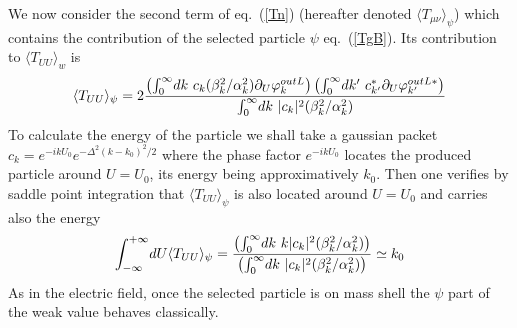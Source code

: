 \documentclass[12pt,oneside]{report}
\def\p {\prime}
\begin{document}
We now consider the second term of eq.~(\ref{Tn}) (hereafter denoted 
$\langle T_{\mu\nu}\rangle_{\psi}$)
which contains
the contribution of the selected particle $\psi$ eq.~(\ref{TgB}). 
Its contribution to $\langle T_{UU}\rangle_w$ is
\begin{equation}
\langle T_{UU}\rangle_{\psi} =2{
 \left(\int_0^\infty \! dk\ 
c_k (\beta_k^2 /\alpha_k^2) \partial_U \varphi^{out  L}_k\right)\left(
\int_0^\infty \! dk^\p\ 
c_{k^\p}^* 
\partial_U \varphi^{out L *}_{k^\p}\right)
\over 
\int_0^\infty \! dk\ 
\vert c_k \vert^2 ( \beta_k^2/ \alpha_k^2)
}
\label{To}
\end{equation}
To calculate the energy of the particle we shall take a
gaussian packet \break $c_k = e^{-ik U_0} e^{-\Delta^2
(k-k_0)^2/2}$ where the phase factor $e^{-ik U_0}$ locates the
produced particle around $U=U_0$, its energy being
approximatively $k_0$. Then one verifies by saddle point
integration that $\langle T_{UU}\rangle_{\psi}$ is also
located around $U=U_0$
and carries also the energy 
\begin{equation}
\int_{-\infty}^{+\infty}\!dU
\langle T_{UU}\rangle_{\psi} = {{\left(\int_0^\infty\!dk\ k \vert c_k
\vert^2 ( \beta_k^2/ \alpha_k^2) \right)}\over{\left(
\int_0^\infty\!dk\ \vert c_k
\vert^2 ( \beta_k^2/ \alpha_k^2) \right)}}\simeq k_0
\label{ToB}\end{equation}
As in the electric field, once the selected particle is on mass shell
the $\psi$ part of the weak value behaves classically.
\end{document}
